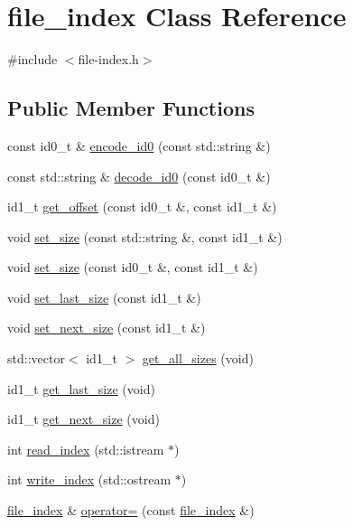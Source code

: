 \hypertarget{classfile__index}{\section{file\-\_\-index Class Reference}
\label{classfile__index}
}


{\ttfamily \#include $<$file-\/index.\-h$>$}

\subsection*{Public Member Functions}
\begin{DoxyCompactItemize}
\item 
const id0\-\_\-t \& \hyperlink{classfile__index_a9bc1769c562f2fc28956fb37326d4960}{encode\-\_\-id0} (const std\-::string \&)
\item 
const std\-::string \& \hyperlink{classfile__index_abbd1d70fee35330f0c3e6e1d7476e0fc}{decode\-\_\-id0} (const id0\-\_\-t \&)
\item 
id1\-\_\-t \hyperlink{classfile__index_a2ee314e1d2e8b081d58a320842790ed9}{get\-\_\-offset} (const id0\-\_\-t \&, const id1\-\_\-t \&)
\item 
void \hyperlink{classfile__index_a63aed225c5c30dafe1cfb347f29d3b9f}{set\-\_\-size} (const std\-::string \&, const id1\-\_\-t \&)
\item 
void \hyperlink{classfile__index_a2e49d051b8e4eb88df029440f10ee119}{set\-\_\-size} (const id0\-\_\-t \&, const id1\-\_\-t \&)
\item 
void \hyperlink{classfile__index_a25bd955b88e6d020b0841031d8ba3fb2}{set\-\_\-last\-\_\-size} (const id1\-\_\-t \&)
\item 
void \hyperlink{classfile__index_ac0dfe7cdf5127834b03cb02b01c89269}{set\-\_\-next\-\_\-size} (const id1\-\_\-t \&)
\item 
std\-::vector$<$ id1\-\_\-t $>$ \hyperlink{classfile__index_aff106a09e0c19c6bdeb0d000cf7f91bb}{get\-\_\-all\-\_\-sizes} (void)
\item 
id1\-\_\-t \hyperlink{classfile__index_aca45135b9a979671cfa005838be47c56}{get\-\_\-last\-\_\-size} (void)
\item 
id1\-\_\-t \hyperlink{classfile__index_adbb1af73e0f1797f7a71d2ec7817c695}{get\-\_\-next\-\_\-size} (void)
\item 
int \hyperlink{classfile__index_abb372d71f4ddc2a4e5be5f66105ae99d}{read\-\_\-index} (std\-::istream $\ast$)
\item 
int \hyperlink{classfile__index_aa41050f234a3adb88f108d834c7c5ec0}{write\-\_\-index} (std\-::ostream $\ast$)
\item 
\hyperlink{classfile__index}{file\-\_\-index} \& \hyperlink{classfile__index_a175bad8f17a4fc6285903d58d45ab5fd}{operator=} (const \hyperlink{classfile__index}{file\-\_\-index} \&)
\end{DoxyCompactItemize}


